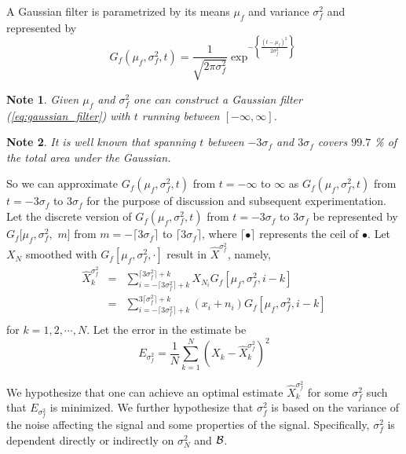 \documentclass[journal,onecolumn]{IEEEtran}
\newcommand{\noise}{n}
\newcommand{\Noise}{N}
\newcommand{\Signal}{X}
\newcommand{\signal}{x}
\newcommand{\x}{\signal}
\newcommand{\BW}{{\cal B}}
\newcommand{\dt}{m}
\newtheorem{mynote}{Note}
\begin{document}
A Gaussian filter is parametrized by its means $\mu_f$ and variance 
$\sigma_f^2$ and represented by
 \begin{equation}
G_f(\mu_f, \sigma_f^2, t) = \frac{1}{\sqrt{2\pi\sigma_f^2}}
\exp^ { - \left \{ \frac{ (t-\mu_f)^2}{2 \sigma_f^2} \right \} }
\label{eq:gaussian_filter}
 \end{equation}
\begin{mynote}
Given $\mu_f$ and $\sigma_f^2$ one can construct a Gaussian filter 
(\ref{eq:gaussian_filter}) with $t$ running between $[-\infty, \infty]$.  
\end{mynote}
\begin{mynote}
It 
is well known that spanning $t$ between $-3 \sigma_f$ and $3 \sigma_f$ 
covers $99.7$ \% of the total area under the Gaussian. 
\end{mynote}
So we can approximate 
$ G_f(\mu_f, \sigma_f^2, t)$ from ${t=-\infty}$ to ${\infty}$ 
as
$G_f(\mu_f, \sigma_f^2, t)$ from ${t=-3 \sigma_f}$ to ${3 \sigma_f}$ 
for the purpose of 
discussion and subsequent experimentation. Let the discrete version of 
$G_f(\mu_f, \sigma_f^2, t)$ from ${t=-3 \sigma_f}$ to ${3 \sigma_f}$ 
be 
represented by 
$G_f[\mu_f, \sigma_f^2,$ $\dt]$ from 
$
\dt = {-\lceil3 \sigma_f\rceil}
$ to 
$
{\lceil 3  \sigma_f \rceil}$, where $\lceil \bullet \rceil$ represents the ceil
of $\bullet$.
Let 
$\Signal_{\Noise}$ 
smoothed with $G_f[\mu_f, \sigma_f^2, \cdot]$ 
result in $\hat{\Signal}^{\sigma_f^2}$, 
namely, 
 \begin{eqnarray}
 \hat{\Signal}_{{k}}^{\sigma_f^2} &= 
&\sum_{i = -\lceil 3 \sigma_f^2 \rceil + k}^{\lceil 3 \sigma_f^2 \rceil +k} \Signal_{\Noise_{i}} 
G_f[\mu_f, \sigma_f^2, i-k] \nonumber \\ 
& = & \sum_{i = - \lceil3 \sigma_f^2 \rceil
+k}^{3 \lceil \sigma_f^2 \rceil +k} {(\x_i + \noise_{i})} G_f[\mu_f,
\sigma_f^2, i-k] \nonumber \\
\label{eq:filtered}
 \end{eqnarray} 
 for $k = 1, 2, \cdots, N$. Let the error 
in the estimate be \begin{equation} 
E_{\sigma^2_f} = \frac{1}{N} \sum_{k=1}^N \left (\Signal_{k} - 
\hat{\Signal}_{k}^{\sigma_f^2} \right )^2 \label{eq:error} 
\end{equation}

We hypothesize that one can achieve an optimal estimate 
$\hat{\Signal}_{k}^{\sigma^2_f}$ for some $\sigma^2_f$ 
such that $E_{\sigma^2_f}$ is minimized. 
We further hypothesize that
$\sigma_f^2$ is based on the 
variance of the noise affecting the signal and some properties of the signal. 
Specifically, $\sigma_f^2$ is 
dependent directly or indirectly on $\sigma_\Noise^2$ and $\BW$.  
\end{document}
